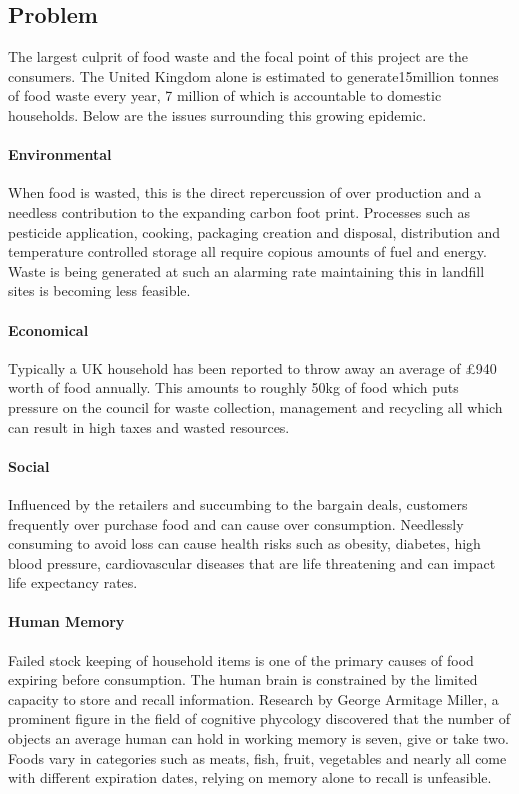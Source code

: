 \documentclass[a4paper, 11pt]{article}
\begin{document}
\subsection{Problem}
The largest culprit of food waste and the focal point of this project are the consumers. The United Kingdom alone is estimated to generate15million tonnes of food waste every year, 7 million of which is accountable to domestic households. Below are the issues surrounding this growing epidemic. 

\paragraph{Environmental}When food is wasted, this is the direct repercussion of over production and a needless contribution to the expanding carbon foot print. Processes such as pesticide application, cooking, packaging creation and disposal, distribution and temperature controlled storage all require copious amounts of fuel and energy. Waste is being generated at such an alarming rate maintaining this in landfill sites is becoming less feasible.

\paragraph{Economical} Typically a UK household has been reported to throw away an average of \pounds940 worth of food annually. This amounts to roughly 50kg of food which puts pressure on the council for waste collection, management and recycling all which can result in high taxes and wasted resources. 

\paragraph{Social} Influenced by the retailers and succumbing to the bargain deals, customers frequently over purchase food and can cause over consumption. Needlessly consuming to avoid loss can cause health risks such as obesity, diabetes, high blood pressure, cardiovascular diseases that are life threatening and can impact life expectancy rates. 

\paragraph{Human Memory} Failed stock keeping of household items is one of the primary causes of food expiring before consumption. The human brain is constrained by the limited capacity to store and recall information. Research by George Armitage Miller, a prominent figure in the field of cognitive phycology discovered that the number of objects an average human can hold in working memory is seven, give or take two.\cite{2} Foods vary in categories such as meats, fish, fruit, vegetables and nearly all come with different expiration dates, relying on memory alone to recall is unfeasible. 
\end{document}
